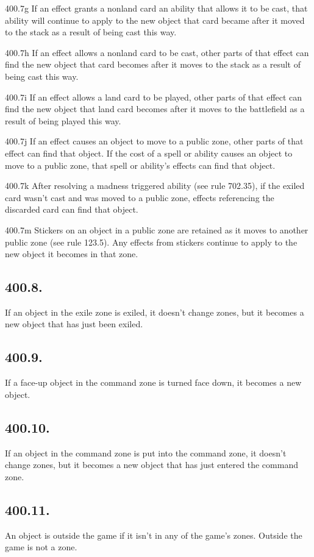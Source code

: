 400.7g If an effect grants a nonland card an ability that allows it to be cast, that ability will continue to apply to the new object that card became after it moved to the stack as a result of being cast this way.

400.7h If an effect allows a nonland card to be cast, other parts of that effect can find the new object that card becomes after it moves to the stack as a result of being cast this way.

400.7i If an effect allows a land card to be played, other parts of that effect can find the new object that land card becomes after it moves to the battlefield as a result of being played this way.

400.7j If an effect causes an object to move to a public zone, other parts of that effect can find that object. If the cost of a spell or ability causes an object to move to a public zone, that spell or ability’s effects can find that object.

400.7k After resolving a madness triggered ability (see rule 702.35), if the exiled card wasn’t cast and was moved to a public zone, effects referencing the discarded card can find that object.

400.7m Stickers on an object in a public zone are retained as it moves to another public zone (see rule 123.5). Any effects from stickers continue to apply to the new object it becomes in that zone.

\subsection*{400.8.}
If an object in the exile zone is exiled, it doesn’t change zones, but it becomes a new object that has just been exiled.

\subsection*{400.9.}
If a face-up object in the command zone is turned face down, it becomes a new object.

\subsection*{400.10.}
If an object in the command zone is put into the command zone, it doesn’t change zones, but it becomes a new object that has just entered the command zone.

\subsection*{400.11.}
An object is outside the game if it isn’t in any of the game’s zones. Outside the game is not a zone.


